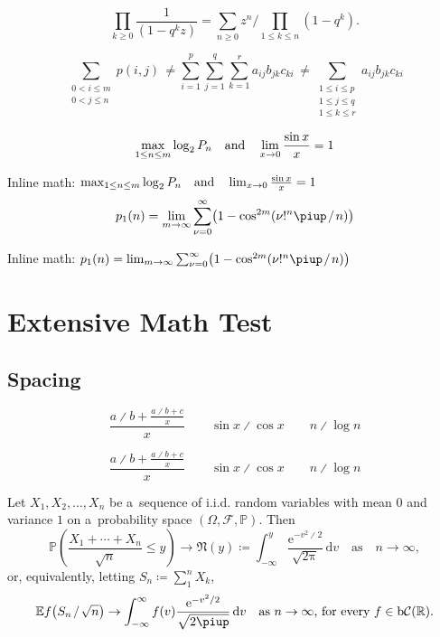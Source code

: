 
	$$\prod_{k\ge0}\frac{1}{(1-q^kz)}=
	\sum_{n\ge0}z^n \bigg/ \!\!\prod_{1\le k\le n}(1-q^k).$$

	$$\sum_{\substack{\scriptstyle 0< i\le m\\\scriptstyle0<j\le n}}p(i,j) \,\ne
	\sum_{i=1}^p \sum_{j=1}^q \sum_{k=1}^r a_{ij} b_{jk} c_{ki} \,\ne
	\sum_{\substack{\scriptstyle 1\le i\le p \\ \scriptstyle 1\le j\le q\\
			\scriptstyle 1\le k\le r}} a_{ij} b_{jk} c_{ki}$$

	\medskip
	$$\max_{1\le n\le m}\log_2P_n \quad \hbox{and} \quad
	\lim_{x\to0}\frac{\sin x}{x}=1$$

	\medskip
	Inline math:
	$\max_{1\le n\le m}\log_2P_n \quad \hbox{and} \quad
	\lim_{x\to0}\frac{\sin x}{x}=1$
	$$p_1(n)=\lim_{m\to\infty}\sum_{\nu=0}^\infty\bigl(1-\cos^{2m}(\nu!^n\piup \divslash n)\bigr)$$

	\medskip
	Inline math:
	$p_1(n)=\lim_{m\to\infty}\sum_{\nu=0}^\infty\bigl(1-\cos^{2m}(\nu!^n\piup \divslash n)\bigr)$

	\endgroup

	\clearpage

	\section{Extensive Math Test \showfamily}

	\subsection{Spacing}

	$$\frac{a \divslash b + \frac{a \divslash b + c}{x}}{x} \qquad \sin x \divslash \cos x \qquad n \divslash \log n$$

	{\boldmath $$\frac{a \divslash b + \frac{a \divslash b + c}{x}}{x} \qquad \sin x \divslash \cos x \qquad n \divslash \log n$$}

	\begin{theorem}
		\label{theorem:SFCLT}
		Let $X_1, X_2, \ldots, X_n$ be a~sequence of i.i.d. random variables with mean $0$
		and variance $1$ on a~probability space $(\Omega, \mathcal{F}, \mathbb{P})$. Then
		\[
			\mathbb{P}{\left(\frac{X_1+\cdots+X_n}{\sqrt{n}}\le y\right)} \to
			\mathfrak{N}(y) \coloneq
			\int_{-\infty}^y \frac{\mathup{e}^{-v^2 \divslash 2}}{\sqrt{2\mathup{\pi}}}\,\mathup{d}v
			\quad\text{as} \quad n\to\infty,
		\]
		or, equivalently, letting $S_n \coloneq \sum_1^n X_k$,
		\[
			\mathbb{E} f \big( S_n \divslash \sqrt{n} \big) \to
			\int_{-\infty}^\infty f(v) \frac{\mathup{e}^{-v^2 \divslash 2}}{\sqrt{2\piup}}\,\mathup{d}v
			\quad \mbox{as $n\to\infty$, for every $f \in \mathup{b}\mathcal{C}(\mathbb{R})$.}
		\]
	\end{theorem}


